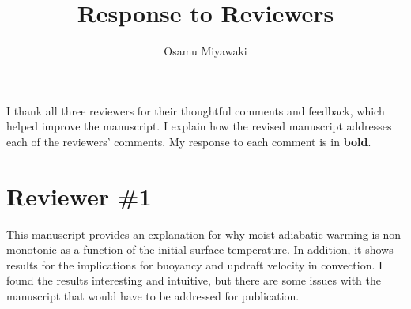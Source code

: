 \documentclass{article}
\title{Response to Reviewers}
\author{Osamu Miyawaki}
\begin{document}
\maketitle

I thank all three reviewers for their thoughtful comments and feedback, which helped improve the manuscript. I explain how the revised manuscript addresses each of the reviewers' comments. My response to each comment is in \textbf{bold}.

\section{Reviewer \#1}

This manuscript provides an explanation for why moist-adiabatic warming is non-monotonic as a function of the initial surface temperature. In addition, it shows results for the implications for buoyancy and updraft velocity in convection. I found the results interesting and intuitive, but there are some issues with the manuscript that would have to be addressed for publication.
\end{document}
